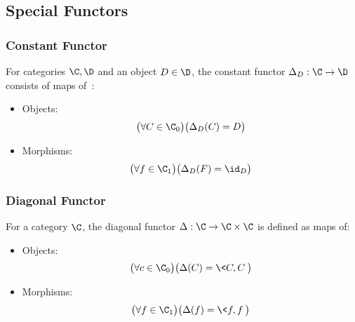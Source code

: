 \subsection{Special Functors}

\subsubsection{Constant Functor}
\begin{definition}
  For categories $\C,\D$ and an object $D\in \D$, the constant functor
  $\Delta_D: \C\to \D$ consists of maps
  of~\parencite[p.~142]{leinster:basic_category_theory}:
  \begin{itemize}
    \item Objects:
      \[\big(\forall C\in \C_0\big)
        \big(\Delta_D(C) = D\big)\]
    \item Morphisms:
      \[\big(\forall f\in \C_1\big)
        \big(\Delta_D(F) = \id_D\big)\]
  \end{itemize}
\end{definition}

\subsubsection{Diagonal Functor}
\begin{definition}\label{def:diagonal_functor_binary}
  For a category $\C$, the diagonal
  functor $\Delta: \C \to \C\times \C$ is defined as maps of:
  \begin{itemize}
    \item Objects:
      \[\big(\forall c\in \C_0\big)
        \big(\Delta(C) = \<C,C\>\big)\]
    \item Morphisms:
      \[\big(\forall f\in \C_1\big)
        \big(\Delta(f) = \<f,f\>\big)\]
  \end{itemize}
\end{definition}

